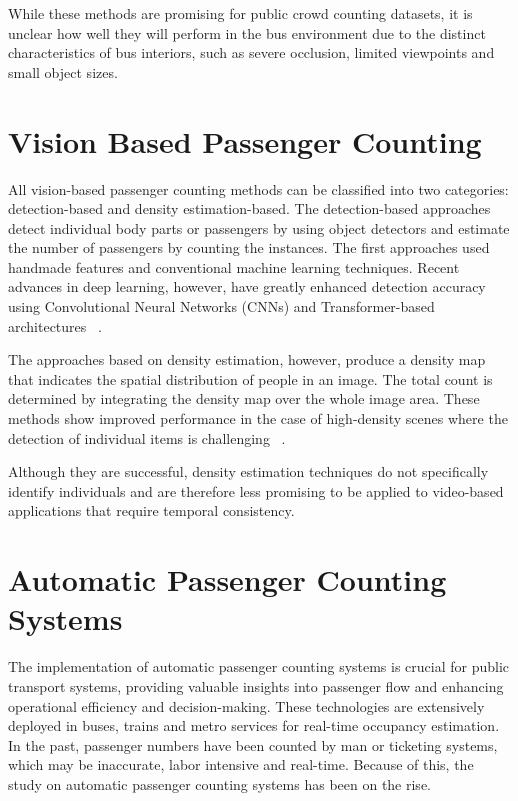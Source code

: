 \documentclass[12pt,a4paper]{report}
\begin{document}
While these methods are promising for public crowd counting datasets, it is unclear how well they will perform in the bus environment due to the distinct characteristics of bus interiors, such as severe occlusion, limited viewpoints and small object sizes.

\section{Vision Based Passenger Counting}

All vision-based passenger counting methods can be classified into two categories: detection-based and density estimation-based. The detection-based approaches detect individual body parts or passengers by using object detectors and estimate the number of passengers by counting the instances. The first approaches used handmade features and conventional machine learning techniques. Recent advances in deep learning, however, have greatly enhanced detection accuracy using Convolutional Neural Networks (CNNs) and Transformer-based architectures ~\cite{sindagi2018survey}.

The approaches based on density estimation, however, produce a density map that indicates the spatial distribution of people in an image. The total count is determined by integrating the density map over the whole image area. These methods show improved performance in the case of high-density scenes where the detection of individual items is challenging ~\cite{Zhang2016}.

Although they are successful, density estimation techniques do not specifically identify individuals and are therefore less promising to be applied to video-based applications that require temporal consistency.

\section{Automatic Passenger Counting Systems}

The implementation of automatic passenger counting systems is crucial for public transport systems, providing valuable insights into passenger flow and enhancing operational efficiency and decision-making. These technologies are extensively deployed in buses, trains and metro services for real-time occupancy estimation. In the past, passenger numbers have been counted by man or ticketing systems, which may be inaccurate, labor intensive and real-time. Because of this, the study on automatic passenger counting systems has been on the rise.
\end{document}
